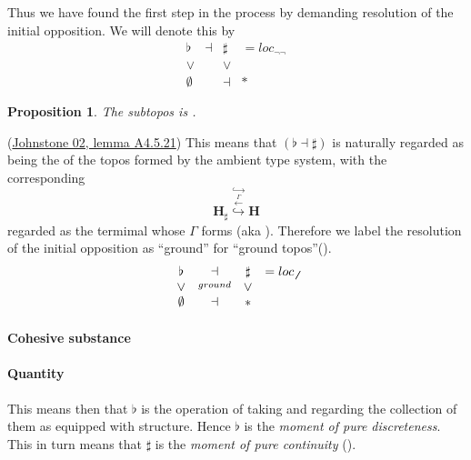 \documentclass[12pt,titlepage]{article}
\newcommand{\itexarray}[1]{\begin{matrix}#1\end{matrix}}
\theoremstyle{plain}
\newtheorem{prop}{Proposition}
\theoremstyle{definition}
\theoremstyle{remark}
\begin{document}
Thus we have found the first step in the process by demanding resolution of the initial opposition. We will denote this by
\begin{displaymath}
\itexarray{
\flat &\dashv& \sharp & = loc_{\neg \neg}
\\
\vee && \vee
\\
\emptyset &&\dashv& \ast
}
\end{displaymath}
\begin{prop}
\label{}\hypertarget{}{}
The  subtopos is .
\end{prop}
(\hyperlink{Johnstone02}{Johnstone 02, lemma A4.5.21})
This means that $(\flat \dashv \sharp)$ is naturally regarded as being the  of the topos formed by the ambient type system, with the corresponding 
\begin{displaymath}
\mathbf{H}_{\sharp}
\stackrel{\hookrightarrow}{\stackrel{\stackrel{\Gamma}{\longleftarrow}}{\hookrightarrow}}
\mathbf{H}
\end{displaymath}
regarded as the termimal  whose  $\Gamma$ forms  (aka ).
Therefore we label the resolution of the initial opposition as ``ground'' for ``ground topos''().
\begin{displaymath}
\itexarray{
\flat &\dashv& \sharp & = loc_{\not\not}
\\
\vee &\stackrel{ground}{}& \vee
\\
\emptyset &\dashv& \ast
}
\end{displaymath}
\hypertarget{cohesive_substance}{}\paragraph*{{Cohesive substance}}\label{cohesive_substance}
\hypertarget{IntensiveExtensive}{}\paragraph*{{Quantity}}\label{IntensiveExtensive}
This means then that $\flat$ is the operation of taking  and regarding the collection of them as equipped with  structure. Hence $\flat$ is the \emph{moment of pure discreteness}.
This in turn means that $\sharp$ is the \emph{moment of pure continuity} ().
\end{document}
